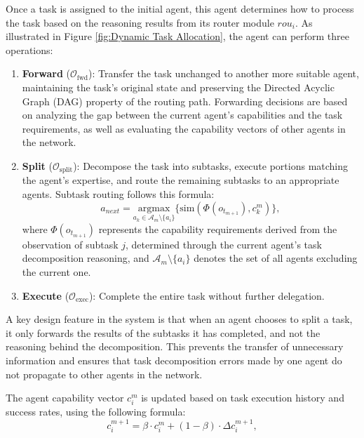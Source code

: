 \documentclass{article}
\begin{document}
Once a task is assigned to the initial agent, this agent determines how to process the task based on the reasoning results from its router module $rou_i$. As illustrated in Figure \ref{fig:Dynamic Task Allocation}, the agent can perform three operations:

\begin{enumerate}
    \item \textbf{Forward} ($\mathcal{O}_{\text{fwd}}$): Transfer the task unchanged to another more suitable agent, maintaining the task's original state and preserving the Directed Acyclic Graph (DAG) property of the routing path. Forwarding decisions are based on analyzing the gap between the current agent's capabilities and the task requirements, as well as evaluating the capability vectors of other agents in the network.
    
    \item \textbf{Split} ($\mathcal{O}_{\text{split}}$): Decompose the task into subtasks, execute portions matching the agent's expertise, and route the remaining subtasks to an appropriate agents. Subtask routing follows this formula:
    \begin{equation}
    a_{next} = \underset{a_k \in \mathcal{A}_m \setminus \{a_i\}}{\text{argmax}} \{ \text{sim}(\Phi(o_{t_{m+1}}), c_k^m) \},
    \end{equation}
    where $\Phi(o_{t_{m+1}})$ represents the capability requirements derived from the observation of subtask $j$, determined through the current agent's task decomposition reasoning, and $\mathcal{A}_m \setminus \{a_i\}$ denotes the set of all agents excluding the current one.
    
    \item \textbf{Execute} ($\mathcal{O}_{\text{exec}}$): Complete the entire task without further delegation.
\end{enumerate}

A key design feature in the system is that when an agent chooses to split a task, it only forwards the results of the subtasks it has completed, and not the reasoning behind the decomposition. This prevents the transfer of unnecessary information and ensures that task decomposition errors made by one agent do not propagate to other agents in the network.

The agent capability vector $c_i^m$ is updated based on task execution history and success rates, using the following formula:
\begin{equation}
c_i^{m+1} = \beta \cdot c_i^m + (1-\beta) \cdot \Delta c_i^{m+1},
\end{equation}
\end{document}
